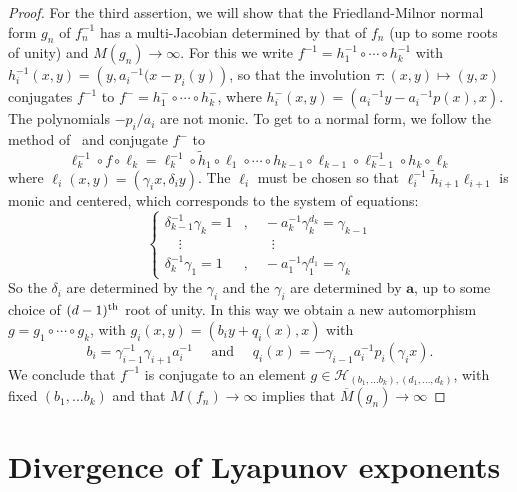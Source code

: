 \documentclass[oneside, 12pt]{amsart}
\newcommand{\rond}{\!\circ\!}
\newcommand{\inv}{^{-1}}
\theoremstyle{plain}
\theoremstyle{definition}
\numberwithin{equation}{section}       %
\numberwithin{equation}{section}       %
\begin{document}
\begin{proof}
 For the third assertion, we will show that the Friedland-Milnor normal form $g_n$ of 
  $f_n\inv$  has a    multi-Jacobian determined by that of $f_n$ (up to some roots of unity) 
  and  
$M(g_n)  \to \infty$. 
For this we write 
 $f\inv= h_1\inv \circ\cdots \circ h_k\inv$ with $h_i\inv(x,y)   =  ({y,  {a_i}\inv(x-p_i(y)} )$, so that
 the involution $\tau: (x,y) \mapsto  (y,x)$ conjugates 
 $f\inv$ to $  f^- =   h_1^-  \circ\cdots \circ   h_k^-$, 
 where $  h_i^- (x,y) =  ({a_i}\inv y - {a_i}\inv p(x), x  )$. The polynomials 
 $-p_i/a_i$ are not monic.   
 To get to a normal form, we follow the method of~\cite{friedland-milnor} and  
 conjugate  $  f^-$ to %
\begin{equation}
\ell_k\inv\circ f\circ \ell_k
= \ell_k\inv \circ \tilde  h_1 \circ  \ell_1 \circ  \cdots \circ h_{k-1} \circ  \ell_{k-1}  \rond \ell_{k-1}\inv  \circ  h_k\rond \ell_k 
\end{equation}
where $\ell_i(x,y)= (\gamma_i x, \delta_i y)$. 
The $\ell_i$ must be chosen so that $\ell_{i}\inv \tilde h_{i+1}\ell_{i+1}$ is monic and centered, which corresponds to the  system of equations: 
\begin{equation}
\begin{cases}
\delta_{k-1}  \inv \gamma_k = 1 &, \quad   -a_k\inv \gamma_k^{d_k}= \gamma_{k-1} \\
 \quad \vdots & \quad \quad \vdots  \\
\delta_k\inv \gamma_{1} = 1 &, \quad    -a_1\inv\gamma_{1}^{d_1} = \gamma_k 
\end{cases}
\end{equation}
So the $\delta_i$ are determined by the $\gamma_i$ and the 
$\gamma_i$ are determined by  $\mathbf a$, up to some choice of $(d-1)^{\rm th }$ root of unity.   
 In this way we obtain a new automorphism
$g = g_1\circ \cdots \circ  g_k$, with $g_i(x,y) = (b_i y+ q_i(x), x)$ with 
\begin{equation}
b_i = \gamma_{i-1}\inv\gamma_{i+1} a_i\inv \quad \text{ and } \quad 
q_i (x)= -\gamma_{i-1}a_i\inv p_i (\gamma_ix).
\end{equation}   
We conclude that $f\inv$ is conjugate to an element 
  $g\in \mathcal H_{(b_1, \ldots b_k), (d_1, \ldots , d_k)}$, 
  with fixed $(b_1, \ldots b_k)$ 
and that $M(f_n)\to \infty$ implies that $\overline M(g_n)\to \infty$
 \end{proof}


\section{Divergence of  Lyapunov exponents}\label{sec:lyapunov}
\end{document}
